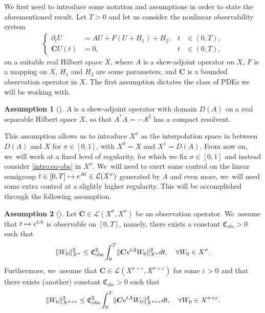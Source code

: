 \documentclass[JEP,XML,SOM,Unicode,published]{cedram}
\newcommand\mto{\mathchoice{\longmapsto}{\mapsto}{\mapsto}{\mapsto}}
\theoremstyle{definition}
\newtheorem{assum}{Assumption}
\newenvironment{assump}[2][]
{\renewcommand\theassum{#2}\begin{assum}[#1]}
{\end{assum}}
\let\mc\mathcal
\let\veps\varepsilon
\newcommand{\bC}{\boldsymbol{C}}
\providecommand{\norm}[1]{\lVert#1\rVert}
\begin{document}
We first need to introduce some notation and assumptions in order to state the aforementioned result. Let $T>0$ and let us consider the nonlinear observability system
\begin{align}\label{intro:eq-obs}
\left\{\begin{aligned}
\partial_t U&=AU+F(U+H_1)+H_2, &t&\in (0, T), \\
\bC U(t)&=0, &t&\in (0, T),
\end{aligned}\right.
\end{align}
on a suitable real Hilbert space $X$, where $A$ is a skew-adjoint operator on $X$, $F$ is a mapping on $X$, $H_1$ and $H_2$ are some parameters, and $\bC$ is a bounded observation operator in $X$. The first assumption dictates the class of PDEs we will be working with.
\begin{assump}{1}
\label{assumAA}$A$ is a skew-adjoint operator with domain $D(A)$ on a real separable Hilbert space $X$, so that $A^*A=-A^2$ has a compact resolvent.
\end{assump}
This assumption allows us to introduce $X^\sigma$ as the interpolation space in between $D(A)$ and $X$ for $\sigma\in [0, 1]$, with $X^0=X$ and $X^1=D(A)$. From now on, we~will work at a fixed level of regularity, for which we fix $\sigma\in [0, 1]$ and instead consider \eqref{intro:eq-obs} in $X^\sigma$. We~will need to exert some control on the linear semigroup $t\in [0, T]\mto e^{At}\in \mc{L}(X^\sigma)$ generated by $A$ and even more, we~will need some extra control at a slightly higher regularity. This will be accomplished through the following assumption.

\begin{assump}{2}
\label{assumCC}Let $\bC\in\mc{L}(X^\sigma, X^\sigma)$ be an observation operator. We~assume that $t\mto e^{tA}$ is observable on $[0,T]$, namely, there exists a constant $\mathfrak{C}_{obs}>0$ such that
\begin{align}\label{observabstractintro}
\norm{W_0}_{X^\sigma}^2\leq \mathfrak{C}_{\textup{obs}}^2\int_0^T \norm{\bC e^{tA}W_0}_{X^\sigma}^2dt,\quad \forall W_0\in X^\sigma.
\end{align}
Furthermore, we~assume that $\bC\in\mc{L}(X^{\sigma+\veps}, X^{\sigma+\veps})$ for some $\veps>0$ and that there exists (another) constant $\mathfrak{C}_{obs}>0$ such that
\begin{align}\label{observabstractvepsintro}
\norm{W_0}_{X^{\sigma+\veps}}^2\leq \mathfrak{C}_{\textup{obs}}^2\int_0^T \norm{\bC e^{tA}W_0}_{X^{\sigma+\veps}}^2dt,\quad \forall W_0\in X^{\sigma+\veps}.
\end{align}
\end{assump}
\end{document}
